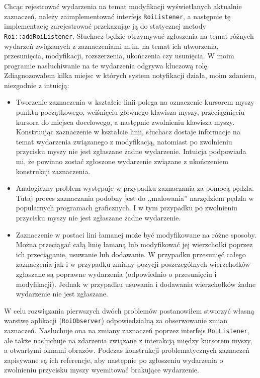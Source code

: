 \documentclass[declaration,shortabstract,mgr]{iithesis}
\begin{document}
Chcąc rejestrować wydarzenia na temat modyfikacji wyświetlanych aktualnie zaznaczeń, należy zaimplementować interfejs \texttt{RoiListener}, a następnie tę implementację zarejestrować przekazując ją do statycznej metody \texttt{Roi::addRoiListener}.
Słuchacz będzie otrzymywać zgłoszenia na temat różnych wydarzeń związanych z zaznaczeniami m.in. na temat ich utworzenia, przesunięcia, modyfikacji, rozszerzenia, ukończenia czy usunięcia.
W moim programie nasłuchiwanie na te wydarzenia odgrywa kluczową rolę.
Zdiagnozowałem kilka miejsc w których system notyfikacji działa, moim zdaniem, niezgodnie z intuicją:
\begin{itemize}
  \item Tworzenie zaznaczenia w kształcie linii polega na oznaczenie kursorem myszy punktu początkowego, wciśnięciu głównego klawisza myszy, przeciągnięciu kursora do miejsca docelowego, a następnie zwolnieniu klawisza myszy. Konstruując zaznaczenie w kształcie linii, słuchacz dostaje informacje na temat wydarzenia związanego z modyfikacją, natomiast po zwolnieniu przycisku myszy nie jest zgłaszane żadne wydarzenie. Intuicja podpowiada mi, że powinno zostać zgłoszone wydarzenie związane z ukończeniem konstrukcji zaznaczenia.
  \item Analogiczny problem występuje w przypadku zaznaczania za pomocą pędzla. Tutaj proces zaznaczania podobny jest do ,,malowania'' narzędziem pędzla w popularnych programach graficznych. I w tym przypadku po zwolnieniu przycisku myszy nie jest zgłaszane żadne wydarzenie.
  \item Zaznaczenie w postaci lini łamanej może być modyfikowane na różne sposoby. Można przeciągać całą linię łamaną lub modyfikować jej wierzchołki poprzez ich przeciąganie, usuwanie lub dodawanie. W przypadku przesunięć całego zaznaczenia jak i w przypadku zmiany pozycji poszczególnych wierzchołków zgłaszane są poprawne wydarzenia (odpowiednio o przesunięciu i modyfikacji). Jednak w przypadku usuwania i dodawania wierzchołków żadne wydarzenie nie jest zgłaszane.
\end{itemize}

W celu rozwiązania pierwszych dwóch problemów postanowiłem stworzyć własną warstwę aplikacji (\texttt{RoiObserver}) odpowiedzialną za obserwowanie zmian zaznaczeń.
Nasłuchuje ona na zmiany zaznaczeń poprzez interfejs \texttt{RoiListener}, ale także nasłuchuje na zdarzenia związane z interakcją między kursorem myszy, a otwartymi oknami obrazów.
Podczas konstrukcji problematycznych zaznaczeń zapisywane są ich referencje, aby następnie po zgłoszeniu wydarzenia o zwolnieniu przycisku myszy wyemitować brakujące wydarzenie.
\end{document}
